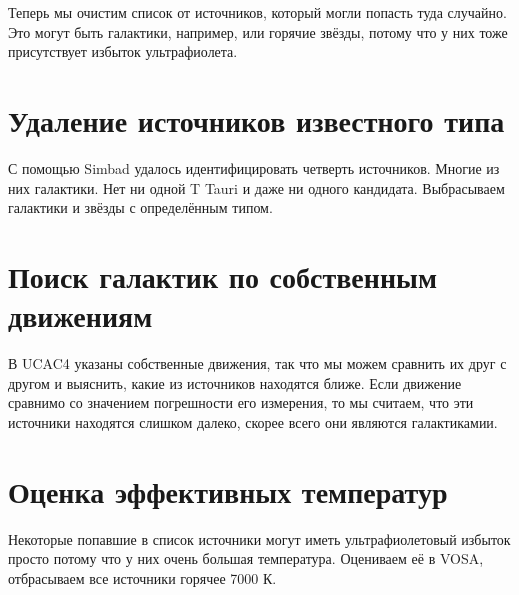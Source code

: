 Теперь мы очистим список от источников, который могли попасть туда случайно. Это могут быть галактики, например, или горячие звёзды, потому что у них тоже присутствует избыток ультрафиолета.

\section{Удаление источников известного типа}
С помощью Simbad удалось идентифицировать четверть источников. Многие из них галактики. Нет ни одной T Tauri и даже ни одного кандидата. Выбрасываем галактики и звёзды с определённым типом.

\section{Поиск галактик по собственным движениям}
В UCAC4 указаны собственные движения, так что мы можем сравнить их друг с другом и выяснить, какие из источников находятся ближе. Если движение сравнимо со значением погрешности его измерения, то мы считаем, что эти источники находятся слишком далеко, скорее всего они являются галактикамии.

\section{Оценка эффективных температур}
Некоторые попавшие в список источники могут иметь ультрафиолетовый избыток просто потому что у них очень большая температура. Оцениваем её в VOSA, отбрасываем все источники горячее 7000 К.

